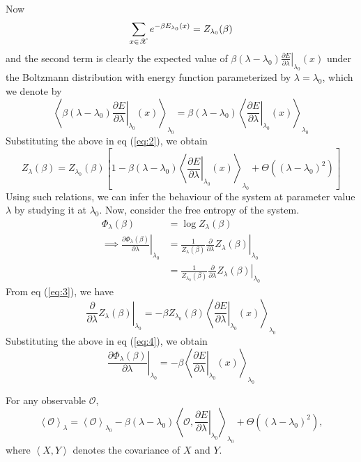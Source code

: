 \documentclass[letterpaper,english,10pt]{article}
\begin{document}
Now
$$\sum_{x \in \mathscr{X}} e^{-\beta E_{\lambda_0}(x)} = Z_{\lambda_0}(\beta)$$
and the second term is clearly the expected value of $\beta (\lambda - \lambda_0) \left. \frac{\partial E}{\partial \lambda} \right|_{\lambda_0}(x)$ under the Boltzmann distribution with energy function parameterized by $\lambda = \lambda_0$, which we denote by
$$ \left\langle \beta (\lambda - \lambda_0) \left. \frac{\partial E}{\partial \lambda} \right|_{\lambda_0}(x) \right\rangle_{\lambda_0} = \beta (\lambda - \lambda_0) \left\langle \left. \frac{\partial E}{\partial \lambda} \right|_{\lambda_0}(x) \right\rangle_{\lambda_0}$$
Substituting the above in eq (\ref{eq:2}), we obtain
\begin{equation}
Z_\lambda(\beta) = Z_{\lambda_0}(\beta) \left[ 1 - \beta (\lambda - \lambda_0) \left\langle \left. \frac{\partial E}{\partial \lambda} \right|_{\lambda_0}(x) \right\rangle_{\lambda_0} + \Theta((\lambda - \lambda_0)^2) \right] \label{eq:3}
\end{equation}
Using such relations, we can infer the behaviour of the system at parameter value $\lambda$ by studying it at $\lambda_0$. Now, consider the free entropy of the system.
\begin{align}
\Phi_\lambda(\beta) &= \log Z_\lambda (\beta) \nonumber \\
\implies \left. \frac{\partial \Phi_\lambda(\beta)}{\partial \lambda} \right|_{\lambda_0} &= \left. \frac{1}{Z_\lambda (\beta)} \frac{\partial}{\partial \lambda} Z_\lambda (\beta) \right|_{\lambda_0} \nonumber \\
&= \frac{1}{Z_{\lambda_0} (\beta)} \left. \frac{\partial}{\partial \lambda} Z_\lambda (\beta) \right|_{\lambda_0} \label{eq:4}
\end{align}
From eq (\ref{eq:3}), we have
$$\left. \frac{\partial}{\partial \lambda} Z_\lambda (\beta) \right|_{\lambda_0} = -\beta Z_{\lambda_0}(\beta) \left\langle \left. \frac{\partial E}{\partial \lambda} \right|_{\lambda_0}(x) \right\rangle_{\lambda_0}$$
Substituting the above in eq (\ref{eq:4}), we obtain
\begin{equation}
\left. \frac{\partial \Phi_\lambda(\beta)}{\partial \lambda} \right|_{\lambda_0} = -\beta \left\langle \left. \frac{\partial E}{\partial \lambda} \right|_{\lambda_0}(x) \right\rangle_{\lambda_0}
\end{equation}
\begin{thm}
For any observable $\mathcal{O}$,
\begin{equation}
\left\langle \mathcal{O} \right\rangle_{\lambda} = \left\langle \mathcal{O} \right\rangle_{\lambda_0} - \beta (\lambda - \lambda_0) \left\langle \mathcal{O}, \left. \frac{\partial E}{\partial \lambda} \right|_{\lambda_0} \right\rangle_{\lambda_0} + \Theta((\lambda - \lambda_0)^2),
\end{equation}
where $\left\langle X, Y \right\rangle$ denotes the covariance of $X$ and $Y$.
\end{thm}
\end{document}

